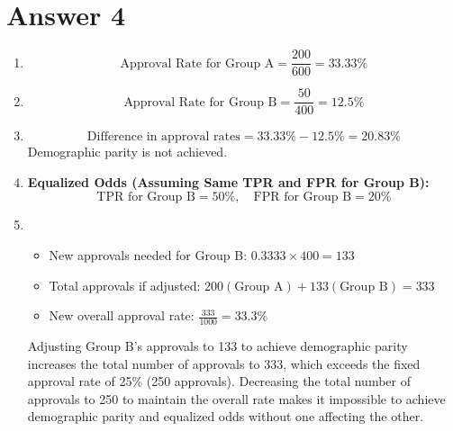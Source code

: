 \documentclass[
	12pt, %
]{fphw}
\begin{document}
\section*{Answer 4}

\begin{enumerate}
    \item 
    \[
    \text{Approval Rate for Group A} = \frac{200}{600} = 33.33\%
    \]

    \item 
    \[
    \text{Approval Rate for Group B} = \frac{50}{400} = 12.5\%
    \]

    \item 
    \[
    \text{Difference in approval rates} = 33.33\% - 12.5\% = 20.83\%
    \]
    Demographic parity is not achieved.

    \item \textbf{Equalized Odds (Assuming Same TPR and FPR for Group B):}
    \[
    \text{TPR for Group B} = 50\%, \quad \text{FPR for Group B} = 20\%
    \]

    \item \begin{itemize}
		\item New approvals needed for Group B: \(0.3333 \times 400 = 133\)
		\item Total approvals if adjusted: \(200 (\text{Group A}) + 133 (\text{Group B}) = 333\)
		\item New overall approval rate: \( \frac{333}{1000} = 33.3\% \)
	\end{itemize}
	Adjusting Group B's approvals to 133 to achieve demographic parity increases the total number of approvals to 333, which exceeds the fixed approval rate of 25\% (250 approvals).
    Decreasing the total number of approvals to 250 to maintain the overall rate makes it impossible to achieve demographic parity and equalized odds without one affecting the other.

\end{enumerate}
\end{document}
